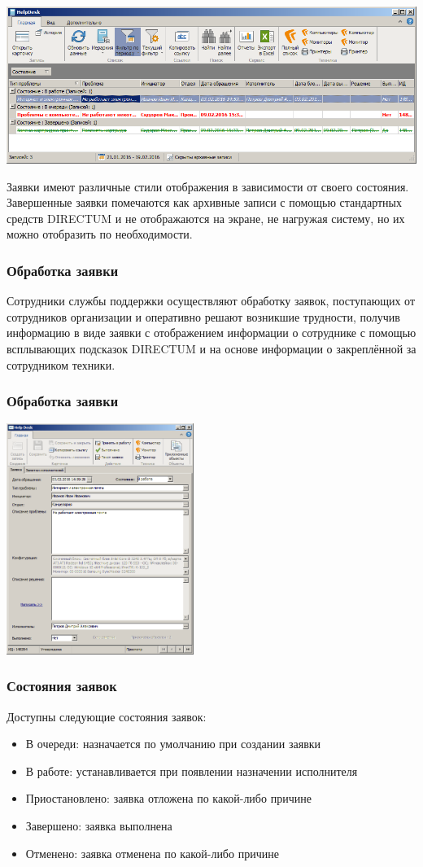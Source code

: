 \documentclass{../industrial-development}
\begin{document}
\begin{frame} 
\centerline{\includegraphics[width=\textwidth]{pic5.png}}
Заявки имеют различные стили отображения в зависимости от своего состояния. Завершенные заявки помечаются как архивные записи с помощью стандартных средств DIRECTUM и не отображаются на экране, не нагружая систему, но их можно отобразить по необходимости.
\end{frame}
\lecturenotes

\begin{frame} \frametitle{Обработка заявки}
Сотрудники службы поддержки осуществляют обработку заявок, поступающих от сотрудников организации и оперативно решают возникшие трудности, получив информацию в виде заявки с отображением информации о сотруднике с помощью всплывающих подсказок DIRECTUM и на основе информации о закреплённой за сотрудником техники.
\end{frame}
\lecturenotes

\begin{frame} \frametitle{Обработка заявки}
\centerline{\includegraphics[height=7.5cm]{pic6.png}}
\end{frame}
\lecturenotes

\begin{frame} \frametitle{Состояния заявок}
	Доступны следующие состояния заявок:
	\begin{itemize}
		\item В очереди: назначается по умолчанию при создании заявки
		\item В работе: устанавливается при появлении назначении исполнителя
		\item Приостановлено: заявка отложена по какой-либо причине
		\item Завершено: заявка выполнена
		\item Отменено: заявка отменена по какой-либо причине
	\end{itemize}
\end{frame}
\lecturenotes
\end{document}
